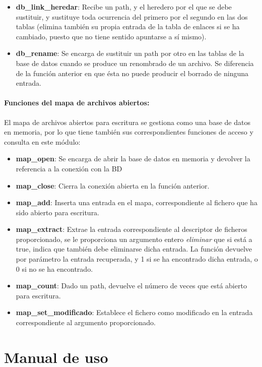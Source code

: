 \documentclass[12pt,a4paper]{article}
\begin{document}
\begin{itemize}
  \item \textbf{db\_link\_heredar}: Recibe un path, y el heredero por el que se debe sustituir, y sustituye toda ocurrencia del primero por el segundo en las dos tablas (elimina también su propia entrada de la tabla de enlaces si se ha cambiado, puesto que no tiene sentido apuntarse a sí mismo).
  \item \textbf{db\_rename}: Se encarga de sustituir un path por otro en las tablas de la base de datos cuando se produce un renombrado de un archivo. Se diferencia de la función anterior en que ésta no puede producir el borrado de ninguna entrada.
\end{itemize}

\paragraph{Funciones del mapa de archivos abiertos:} El mapa de archivos abiertos para escritura se gestiona como una base de datos en memoria, por lo que tiene también sus correspondientes funciones de acceso y consulta en este módulo:
\begin{itemize}
 \item \textbf{map\_open}: Se encarga de abrir la base de datos en memoria y devolver la referencia a la conexión con la BD
 \item \textbf{map\_close}: Cierra la conexión abierta en la función anterior.
 \item \textbf{map\_add}: Inserta una entrada en el mapa, correspondiente al fichero que ha sido abierto para escritura.
 \item \textbf{map\_extract}: Extrae la entrada correspondiente al descriptor de ficheros proporcionado, se le proporciona un argumento entero \textit{eliminar} que si está a true, indica que también debe eliminarse dicha entrada. La función devuelve por parámetro la entrada recuperada, y 1 si se ha encontrado dicha entrada, o 0 si no se ha encontrado.
 \item \textbf{map\_count}: Dado un path, devuelve el número de veces que está abierto para escritura.
 \item \textbf{map\_set\_modificado}: Establece el fichero como modificado en la entrada correspondiente al argumento proporcionado.
\end{itemize}


\newpage
\section{Manual de uso}
\end{document}
